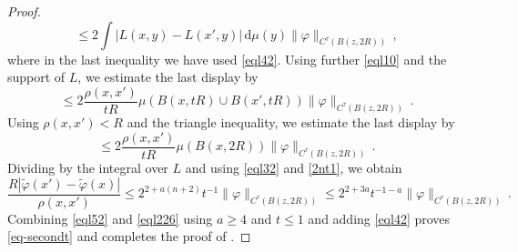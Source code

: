 \begin{proof}
\begin{equation}
    \le 2 \int |L(x,y) -L(x',y)| \, \mathrm{d}\mu(y)
    \|\varphi\|_{C^\tau(B(z, 2R))}\, ,
\end{equation}
where in the last inequality we have used \eqref{eql42}.
Using further \eqref{eql10} and the support of $L$, we estimate the last display by
\begin{equation}\label{eql224}\le 2 \frac{\rho(x,x')} {tR}\mu(B(x,tR)\cup B(x',tR))
\|\varphi\|_{C^\tau(B(z, 2R))}\, .
    \end{equation}
  Using $\rho(x,x')<R$ and the triangle inequality, we estimate the last display by
\begin{equation}\label{eql225}\le 2
\frac{\rho(x,x')} {tR}
\mu(B(x,2R))
\|\varphi\|_{C^\tau(B(z, 2R))}\, .
    \end{equation}
Dividing by the integral over $L$ and using \eqref{eql32} and \eqref{2nt1}, we obtain
\begin{equation}\label{eql226}
 \frac {R |\tilde{\varphi}(x') - \tilde \varphi(x)|}{\rho(x,x')}
 \le 2^{2+a(n+2)}t^{-1}\|\varphi\|_{C^\tau(B(z, 2R))} \le
 2^{2+3a} t^{-1-a} \|\varphi\|_{C^\tau(B(z, 2R))}\, .
\end{equation}
Combining \eqref{eql52} and \eqref{eql226} using $a\ge 4$ and $t\le 1$ and
adding \eqref{eql42} proves \eqref{eq-secondt} and completes the proof
of .
\end{proof}



